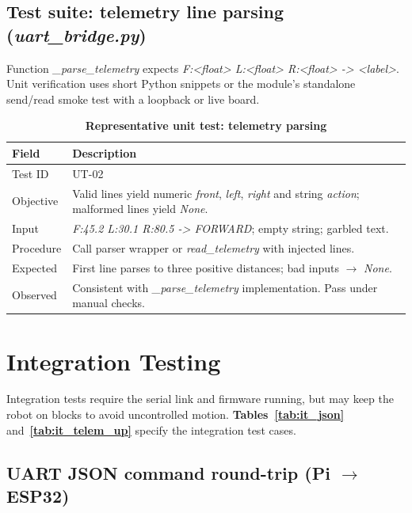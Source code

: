 \subsection[Telemetry parsing]{Test suite: telemetry line parsing (\textit{uart\_bridge.py})}
\label{subsec:ut_telemetry}

Function \textit{\_parse\_telemetry} expects \textit{F:<float> L:<float> R:<float> -> <label>}. Unit verification uses short Python snippets or the module’s standalone send/read smoke test with a loopback or live board.

\begin{table}[H]
\centering
\caption[Representative unit test: telemetry parsing]{\textbf{Representative unit test: telemetry parsing}}
\label{tab:ut_telemetry}
\begin{tabularx}{\textwidth}{|>{\raggedright\arraybackslash}p{3.1cm}|X|}
\hline
\textbf{Field} & \textbf{Description} \\
\hline
Test ID & UT-02 \\ \hline
Objective & Valid lines yield numeric \textit{front}, \textit{left}, \textit{right} and string \textit{action}; malformed lines yield \textit{None}. \\ \hline
Input & \textit{F:45.2 L:30.1 R:80.5 -> FORWARD}; empty string; garbled text. \\ \hline
Procedure & Call parser wrapper or \textit{read\_telemetry} with injected lines. \\ \hline
Expected & First line parses to three positive distances; bad inputs $\rightarrow$ \textit{None}. \\ \hline
Observed & Consistent with \textit{\_parse\_telemetry} implementation. Pass under manual checks. \\
\hline
\end{tabularx}
\end{table}

\section{Integration Testing}
\label{sec:integration_testing}

Integration tests require the serial link and firmware running, but may keep the robot on blocks to avoid uncontrolled motion. \textbf{Tables~\ref{tab:it_json}} and~\textbf{\ref{tab:it_telem_up}} specify the integration test cases.

\subsection[UART command round-trip]{UART JSON command round-trip (Pi $\rightarrow$ ESP32)}
\label{subsec:it_uart_cmd}

